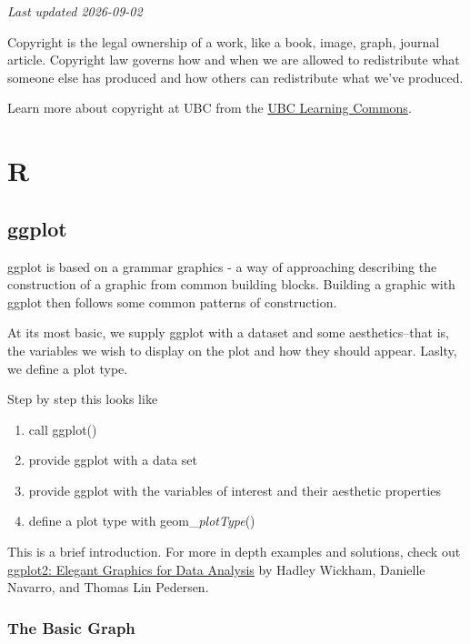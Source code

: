 \documentclass[
]{book}
\providecommand{\tightlist}{%
  \setlength{\itemsep}{0pt}\setlength{\parskip}{0pt}}
\begin{document}
\emph{Last updated 2026-09-02}

Copyright is the legal ownership of a work, like a book, image, graph, journal article. Copyright law governs how and when we are allowed to redistribute what someone else has produced and how others can redistribute what we've produced.

Learn more about copyright at UBC from the \href{https://copyright.ubc.ca/}{UBC Learning Commons}.

\part*{R}\label{part-r}

\chapter{ggplot}\label{ggplot}

ggplot is based on a grammar graphics - a way of approaching describing the construction of a graphic from common building blocks. Building a graphic with ggplot then follows some common patterns of construction.

At its most basic, we supply ggplot with a dataset and some aesthetics--that is, the variables we wish to display on the plot and how they should appear. Laslty, we define a plot type.

Step by step this looks like

\begin{enumerate}
\def\labelenumi{\arabic{enumi}.}
\tightlist
\item
  call ggplot()
\item
  provide ggplot with a data set
\item
  provide ggplot with the variables of interest and their aesthetic properties
\item
  define a plot type with geom\_\emph{plotType}()
\end{enumerate}

This is a brief introduction. For more in depth examples and solutions, check out \href{https://ggplot2-book.org/index.html}{ggplot2: Elegant Graphics for Data Analysis} by Hadley Wickham, Danielle Navarro, and Thomas Lin Pedersen.

\section{The Basic Graph}\label{the-basic-graph}
\end{document}
